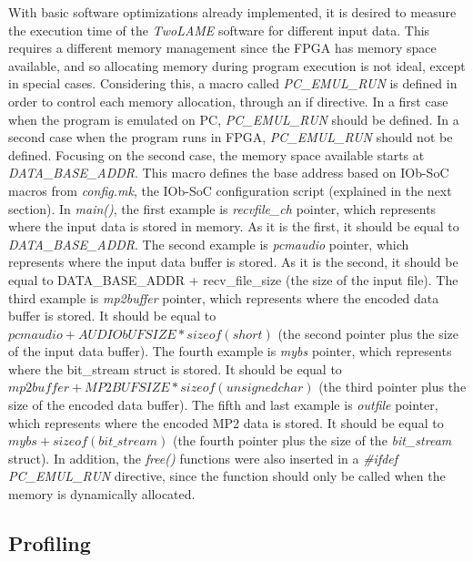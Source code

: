 \documentclass{article}
\begin{document}
With basic software optimizations already implemented, it is desired to measure the execution time of the \textit{TwoLAME} software for different input data. This requires a different memory management since the FPGA has memory space available, and so allocating memory during program execution is not ideal, except in special cases. Considering this, a macro called \textit{PC\_EMUL\_RUN} is defined in order to control each memory allocation, through an if directive. In a first case when the program is emulated on PC, \textit{PC\_EMUL\_RUN} should be defined. In a second case when the program runs in FPGA, \textit{PC\_EMUL\_RUN} should not be defined.
Focusing on the second case, the memory space available starts at \textit{DATA\_BASE\_ADDR}. This macro defines the base address based on IOb-SoC macros from \textit{config.mk}, the IOb-SoC configuration script (explained in the next section).
In \textit{main()}, the first example is \textit{recvfile\_ch} pointer, which represents where the input data is stored in memory. As it is the first, it should be equal to \textit{DATA\_BASE\_ADDR}.
The second example is \textit{pcmaudio} pointer, which represents where the input data buffer is stored. As it is the second, it should be equal to DATA\_BASE\_ADDR + recv\_file\_size (the size of the input file).
The third example is \textit{mp2buffer} pointer, which represents where the encoded data buffer is stored. It should be equal to $pcmaudio + AUDIObUFSIZE*sizeof(short)$ (the second pointer plus the size of the input data buffer).
The fourth example is \textit{mybs} pointer, which represents where the bit\_stream struct is stored. It should be equal to $mp2buffer + MP2BUFSIZE*sizeof(unsigned char)$ (the third pointer plus the size of the encoded data buffer).
The fifth and last example is \textit{outfile} pointer, which represents where the encoded MP2 data is stored. It should be equal to $mybs + sizeof(bit\_stream)$ (the fourth pointer plus the size of the \textit{bit\_stream} struct).
In addition, the \textit{free()} functions were also inserted in a \textit{\#ifdef PC\_EMUL\_RUN} directive, since the function should only be called when the memory is dynamically allocated. \\

\subsection{Profiling}
\end{document}
